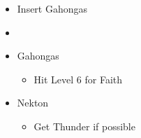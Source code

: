 \begin{menu}
\begin{itemize}
	\paradigm
	\begin{itemize}
		\item Insert Gahongas
		\item {}%
		{\paradigmline{\com}{\com}{\nek}{\X}}%
		{\paradigmline{(\rav)}{(\rav)}{(\gah)}{\W}}%
		{\paradigmline{\rav}{\sab}{\nek}{\W}}%
		{\paradigmline{\sen}{\sen}{\nek}{\W}}%
		{\paradigmline{\rav}{\rav}{\nek}{\W}}%
		{\paradigmline[6]{\textit{\rav}}{\textit{\rav}}{\textit{\nek}}{\textit{\W}}}
	\end{itemize}
	\crystarium
	\begin{itemize}
		\item Gahongas
		\begin{itemize}
			\item Hit Level 6 for Faith
		\end{itemize}
		\item Nekton
		\begin{itemize}
			\item Get Thunder if possible
		\end{itemize}
	\end{itemize}
\end{itemize}
\end{menu}